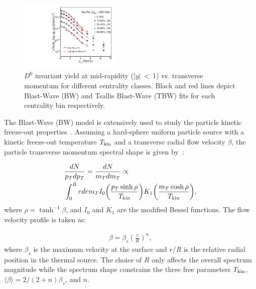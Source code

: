 \documentclass[%
 reprint,	
showpacs,
 amsmath,amssymb,
 aps,
 prc,
]{revtex4-1}
\begin{document}
\begin{figure}
\centering
\includegraphics[width=0.43\textwidth]{fig/BWFit.pdf}
\caption{$D^{0}$ invariant yield at mid-rapidity ($|y|$\,$<$\,1) vs. transverse momentum for different centrality classes. Black and red lines depict Blast-Wave (BW) and Tsallis Blast-Wave (TBW) fits for each centrality bin respectively.}
\label{fig:BWFit} 
\end{figure}

The Blast-Wave (BW) model is extensively used to study the particle kinetic freeze-out properties~\cite{Adams:2003xp,Adamczyk:2017iwn}. Assuming a hard-sphere uniform particle source with a kinetic freeze-out temperature $T_{\rm kin}$ and a transverse radial flow velocity $\beta$, the particle transverse momentum spectral shape is given by~\cite{Schnedermann:1993ws}:

\begin{equation}
  \begin{aligned}
  & \frac{dN}{p_{T}dp_{T}} = \frac{dN}{m_{T}dm_{T}} \propto \\
  & \int_0^R rdr m_{T} I_0\bigg(\frac{p_{T}\sinh\rho}{T_{\rm kin}}\bigg) K_1\bigg(\frac{m_{T}\cosh\rho}{T_{\rm kin}}\bigg),
  \end{aligned}
\label{equ:equation8}
\end{equation}
where $\rho = \tanh^{-1}\beta$, and $I_0$ and $K_1$ are the modified Bessel functions. The flow velocity profile is taken as:

\begin{equation}
  \begin{aligned}
    \beta = \beta_{s}\left(\frac{r}{R}\right)^{n},
  \end{aligned}
\label{equ:equation9}
\end{equation}
where $\beta_{s}$ is the maximum velocity at the surface and $r/R$ is the relative radial position in the thermal source. The choice of $R$ only affects the overall spectrum magnitude while the spectrum shape constrains the three free parameters $T_{\rm kin}$, $\langle\beta\rangle=2/(2+n)\beta_{s}$, and $n$.
\end{document}
